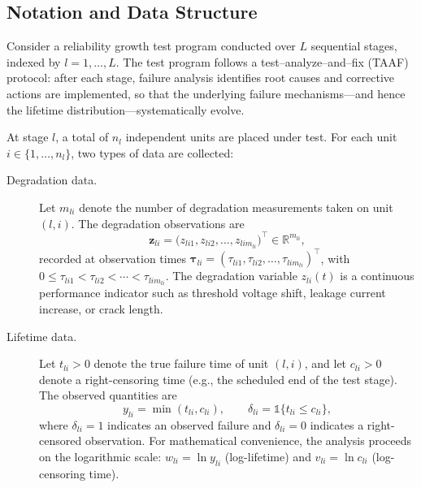 \documentclass[a4paper,fleqn,longmktitle]{cas-sc}
\newcommand{\R}{\mathbb{R}}
\begin{document}
\subsection{Notation and Data Structure}
\label{sec:notation}

Consider a reliability growth test program conducted over $L$ sequential stages, indexed by $l = 1, \ldots, L$. The test program follows a test--analyze--and--fix (TAAF) protocol: after each stage, failure analysis identifies root causes and corrective actions are implemented, so that the underlying failure mechanisms---and hence the lifetime distribution---systematically evolve.

At stage $l$, a total of $n_l$ independent units are placed under test. For each unit $i \in \{1, \ldots, n_l\}$, two types of data are collected:

\begin{description}
    \item[Degradation data.] Let $m_{li}$ denote the number of degradation measurements taken on unit $(l,i)$. The degradation observations are
    \begin{equation}\label{eq:degrad_vec}
        \bm{z}_{li} = \bigl(z_{li1}, z_{li2}, \ldots, z_{li m_{li}}\bigr)^{\top} \in \R^{m_{li}},
    \end{equation}
    recorded at observation times $\bm{\tau}_{li} = (\tau_{li1}, \tau_{li2}, \ldots, \tau_{li m_{li}})^{\top}$, with $0 \leq \tau_{li1} < \tau_{li2} < \cdots < \tau_{li m_{li}}$. The degradation variable $z_{li}(t)$ is a continuous performance indicator such as threshold voltage shift, leakage current increase, or crack length.

    \item[Lifetime data.] Let $t_{li} > 0$ denote the true failure time of unit $(l,i)$, and let $c_{li} > 0$ denote a right-censoring time (e.g., the scheduled end of the test stage). The observed quantities are
    \begin{equation}\label{eq:obs_life}
        y_{li} = \min(t_{li}, c_{li}), \qquad
        \delta_{li} = \mathbb{1}\{t_{li} \leq c_{li}\},
    \end{equation}
    where $\delta_{li} = 1$ indicates an observed failure and $\delta_{li} = 0$ indicates a right-censored observation. For mathematical convenience, the analysis proceeds on the logarithmic scale: $w_{li} = \ln y_{li}$ (log-lifetime) and $v_{li} = \ln c_{li}$ (log-censoring time).
\end{description}
\end{document}
